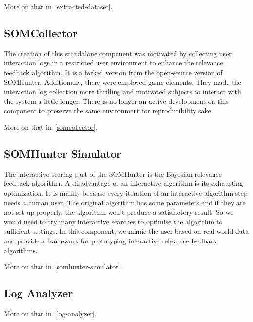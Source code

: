 More on that in~\cref{extracted-dataset}.

\subsection{SOMCollector}

The creation of this standalone component was motivated by collecting user interaction logs in a restricted user environment to enhance the relevance feedback algorithm. It is a forked version from the open-source version of SOMHunter. Additionally, there were employed game elements. They made the interaction log collection more thrilling and motivated subjects to interact with the system a little longer. There is no longer an active development on this component to preserve the same environment for reproducibility sake.

More on that in~\cref{somcollector}.

\subsection{SOMHunter Simulator}

The interactive scoring part of the SOMHunter is the Bayesian relevance feedback algorithm. A disadvantage of an interactive algorithm is its exhausting optimization. It is mainly because every iteration of an interactive algorithm step needs a human user. The original algorithm has some parameters and if they are not set up properly, the algorithm won't produce a satisfactory result. So we would need to try many interactive searches to optimise the algorithm to sufficient settings. In this component, we mimic the user based on real-world data and provide a framework for prototyping interactive relevance feedback algorithms.

More on that in~\cref{somhunter-simulator}.

\subsection{Log Analyzer}

More on that in~\cref{log-analyzer}.


